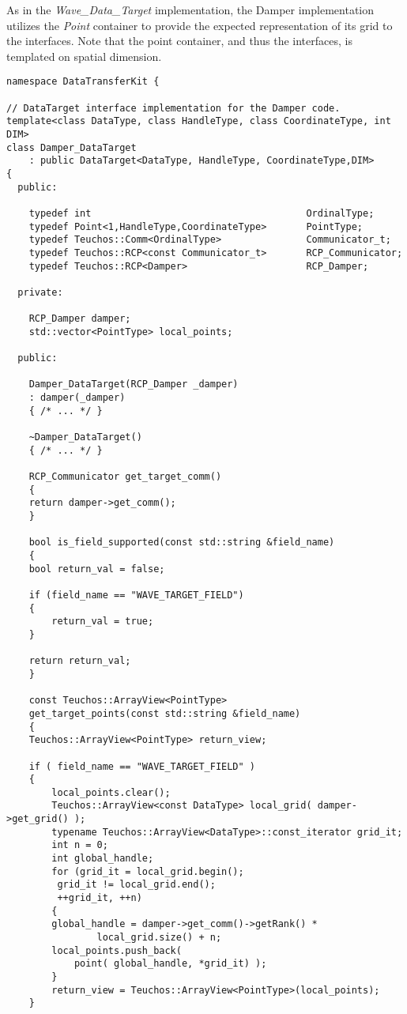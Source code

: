 \documentclass[letterpaper]{article}
\begin{document}
As in the {\sl Wave\_Data\_Target} implementation, the Damper
implementation utilizes the {\sl Point} container to provide the
expected representation of its grid to the interfaces. Note that the
point container, and thus the interfaces, is templated on spatial
dimension.

\begin{lstlisting}
namespace DataTransferKit {

// DataTarget interface implementation for the Damper code.
template<class DataType, class HandleType, class CoordinateType, int DIM>
class Damper_DataTarget 
    : public DataTarget<DataType, HandleType, CoordinateType,DIM>
{
  public:

    typedef int                                      OrdinalType;
    typedef Point<1,HandleType,CoordinateType>       PointType;
    typedef Teuchos::Comm<OrdinalType>               Communicator_t;
    typedef Teuchos::RCP<const Communicator_t>       RCP_Communicator;
    typedef Teuchos::RCP<Damper>                     RCP_Damper;

  private:

    RCP_Damper damper;
    std::vector<PointType> local_points;

  public:

    Damper_DataTarget(RCP_Damper _damper)
	: damper(_damper)
    { /* ... */ }

    ~Damper_DataTarget()
    { /* ... */ }

    RCP_Communicator get_target_comm()
    {
	return damper->get_comm();
    }

    bool is_field_supported(const std::string &field_name)
    {
	bool return_val = false;

	if (field_name == "WAVE_TARGET_FIELD")
	{
	    return_val = true;
	}

	return return_val;
    }

    const Teuchos::ArrayView<PointType> 
    get_target_points(const std::string &field_name)
    {
	Teuchos::ArrayView<PointType> return_view;

	if ( field_name == "WAVE_TARGET_FIELD" )
	{
	    local_points.clear();
	    Teuchos::ArrayView<const DataType> local_grid( damper->get_grid() );
	    typename Teuchos::ArrayView<DataType>::const_iterator grid_it;
	    int n = 0;
	    int global_handle;
	    for (grid_it = local_grid.begin(); 
		 grid_it != local_grid.end();
		 ++grid_it, ++n)
	    {
		global_handle = damper->get_comm()->getRank() *
				local_grid.size() + n;
		local_points.push_back( 
		    point( global_handle, *grid_it) );
	    }
	    return_view = Teuchos::ArrayView<PointType>(local_points);
	}


\end{lstlisting}
\end{document}
